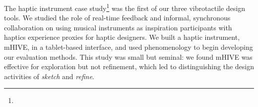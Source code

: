 \noindent
{} The haptic instrument case study\footnote{} was the first of our three vibrotactile design tools.
We studied the role of real-time feedback and informal, synchronous collaboration on \haxd using musical instruments as inspiration 
participants with haptics experience  proxies for haptic designers.
We built a haptic instrument, mHIVE, in a tablet-based interface, and used phenomenology to begin developing our evaluation methods.
This study was small but seminal: we found mHIVE was effective for exploration but not refinement, which led to distinguishing the design activities of \emph{sketch} and \emph{refine}.









